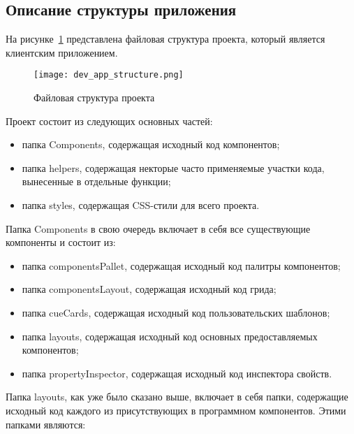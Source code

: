\subsection{Описание структуры приложения}
\label{sec:development:app_structure}

На рисунке~\ref{sec:development:app_structure_pic} представлена файловая структура проекта, который является клиентским приложением.

\begin{figure}[ht]
\centering
    \texttt{[image: dev\_app\_structure.png]}
    \caption{Файловая структура проекта}
    \label{sec:development:app_structure_pic}
\end{figure}

Проект состоит из следующих основных частей:

\begin{itemize}
    \item папка Components, содержащая исходный код компонентов;
    \item папка helpers, содержащая некторые часто применяемые участки кода, вынесенные в отдельные функции;
    \item папка styles, содержащая CSS-стили для всего проекта.
\end{itemize}

Папка Components в свою очередь включает в себя все существующие компоненты и состоит из:

\begin{itemize}
    \item папка componentsPallet, содержащая исходный код палитры компонентов;
    \item папка componentsLayout, содержащая исходный код грида;
    \item папка cueCards, содержащая исходный код пользовательских шаблонов;
    \item папка layouts, содержащая исходный код основных предоставляемых компонентов;
    \item папка propertyInspector, содержащая исходный код инспектора свойств.
\end{itemize}

Папка layouts, как уже было сказано выше, включает в себя папки, содержащие исходный код каждого из присутствующих в программном компонентов. Этими папками являются:

